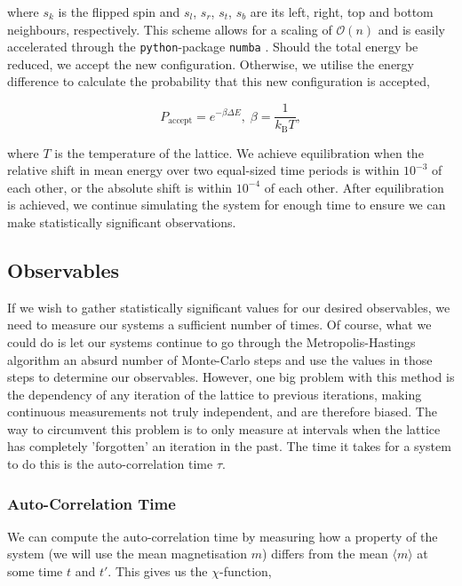 \documentclass{IAYCPro}
\begin{document}
where $s_k$ is the flipped spin and $s_l$, $s_r$, $s_t$, $s_b$ are its left, right, top and bottom neighbours, respectively. This scheme allows for a scaling of $\mathcal{O}(n)$ and is easily accelerated through the \texttt{python}-package \texttt{numba} \cite{lam2015numba}. Should the total energy be reduced, we accept the new configuration. Otherwise, we utilise the energy difference to calculate the probability that this new configuration is accepted,

\begin{equation}
    P_\mathrm{accept} = e^{-\beta\Delta E}, \; \beta = \frac{1}{k_\mathrm{B}T},
\end{equation}

where $T$ is the temperature of the lattice. We achieve equilibration when the relative shift in mean energy over two equal-sized time periods is within $10^{-3}$ of each other, or the absolute shift is within $10^{-4}$ of each other. After equilibration is achieved, we continue simulating the system for enough time to ensure we can make statistically significant observations.

\raggedbottom
\newpage

\subsection{Observables}

If we wish to gather statistically significant values for our desired observables, we need to measure our systems a sufficient number of times. Of course, what we could do is let our systems continue to go through the Metropolis-Hastings algorithm an absurd number of Monte-Carlo steps and use the values in those steps to determine our observables. However, one big problem with this method is the dependency of any iteration of the lattice to previous iterations, making continuous measurements not truly independent, and are therefore biased. The way to circumvent this problem is to only measure at intervals when the lattice has completely 'forgotten' an iteration in the past. The time it takes for a system to do this is the auto-correlation time $\tau$. 

\subsubsection{Auto-Correlation Time}

We can compute the auto-correlation time by measuring how a property of the system (we will use the mean magnetisation $m$) differs from the mean $\langle m \rangle$ at some time $t$ and $t'$. This gives us the $\chi$-function,
\end{document}
